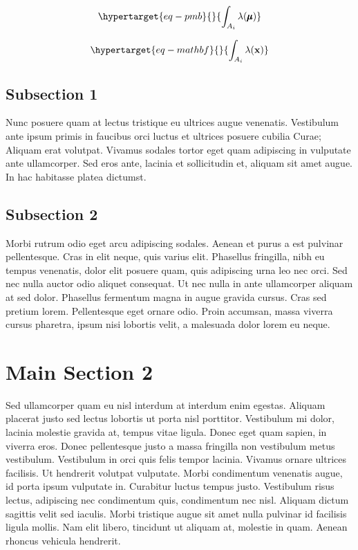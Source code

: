 \documentclass[
  letterpaper,
  11pt,
  spanish,
  singlespacing,
  headsepline]{MastersDoctoralThesis}
\begin{document}
\begin{equation}\protect\hypertarget{eq-pmb}{}{
\int_{A_i}{\lambda (\pmb{\mu})}
}\label{eq-pmb}\end{equation}

\begin{equation}\protect\hypertarget{eq-mathbf}{}{
\int_{A_i}{\lambda (\mathbf{x})}
}\label{eq-mathbf}\end{equation}

\hypertarget{subsection-1}{%
\subsection{Subsection 1}\label{subsection-1}}

Nunc posuere quam at lectus tristique eu ultrices augue venenatis.
Vestibulum ante ipsum primis in faucibus orci luctus et ultrices posuere
cubilia Curae; Aliquam erat volutpat. Vivamus sodales tortor eget quam
adipiscing in vulputate ante ullamcorper. Sed eros ante, lacinia et
sollicitudin et, aliquam sit amet augue. In hac habitasse platea
dictumst.

\hypertarget{subsection-2}{%
\subsection{Subsection 2}\label{subsection-2}}

Morbi rutrum odio eget arcu adipiscing sodales. Aenean et purus a est
pulvinar pellentesque. Cras in elit neque, quis varius elit. Phasellus
fringilla, nibh eu tempus venenatis, dolor elit posuere quam, quis
adipiscing urna leo nec orci. Sed nec nulla auctor odio aliquet
consequat. Ut nec nulla in ante ullamcorper aliquam at sed dolor.
Phasellus fermentum magna in augue gravida cursus. Cras sed pretium
lorem. Pellentesque eget ornare odio. Proin accumsan, massa viverra
cursus pharetra, ipsum nisi lobortis velit, a malesuada dolor lorem eu
neque.

\hypertarget{main-section-2}{%
\section{Main Section 2}\label{main-section-2}}

Sed ullamcorper quam eu nisl interdum at interdum enim egestas. Aliquam
placerat justo sed lectus lobortis ut porta nisl porttitor. Vestibulum
mi dolor, lacinia molestie gravida at, tempus vitae ligula. Donec eget
quam sapien, in viverra eros. Donec pellentesque justo a massa fringilla
non vestibulum metus vestibulum. Vestibulum in orci quis felis tempor
lacinia. Vivamus ornare ultrices facilisis. Ut hendrerit volutpat
vulputate. Morbi condimentum venenatis augue, id porta ipsum vulputate
in. Curabitur luctus tempus justo. Vestibulum risus lectus, adipiscing
nec condimentum quis, condimentum nec nisl. Aliquam dictum sagittis
velit sed iaculis. Morbi tristique augue sit amet nulla pulvinar id
facilisis ligula mollis. Nam elit libero, tincidunt ut aliquam at,
molestie in quam. Aenean rhoncus vehicula hendrerit.
\end{document}
